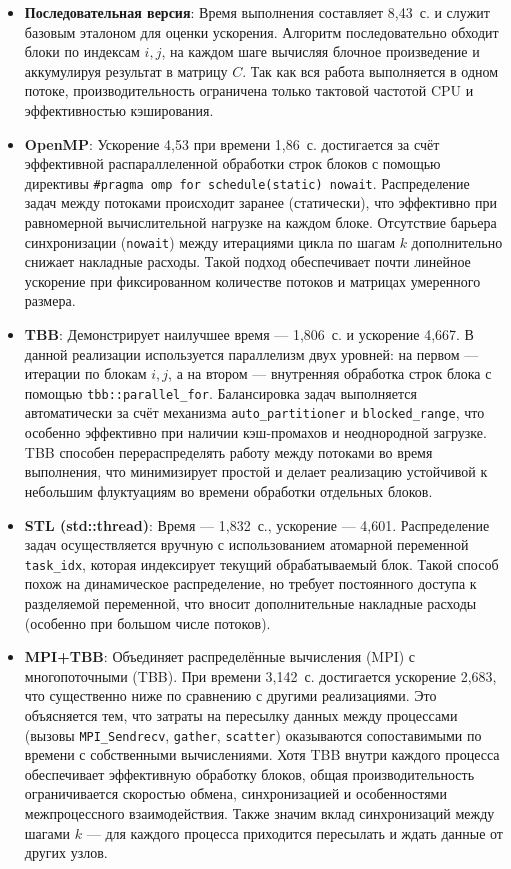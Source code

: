 \documentclass[12pt,a4paper]{extarticle}
\begin{document}
\begin{itemize}
	
	\item \textbf{Последовательная версия}: Время выполнения составляет 8{,}43~с. и служит базовым эталоном для оценки ускорения.  
	Алгоритм последовательно обходит блоки по индексам \(i, j\), на каждом шаге вычисляя блочное произведение и аккумулируя результат в матрицу \(C\).  
	Так как вся работа выполняется в одном потоке, производительность ограничена только тактовой частотой CPU и эффективностью кэширования.
	
	\item \textbf{OpenMP}: Ускорение 4{,}53 при времени 1{,}86~с. достигается за счёт эффективной распараллеленной обработки строк блоков с помощью директивы \texttt{\#pragma omp for schedule(static) nowait}.  
	Распределение задач между потоками происходит заранее (статически), что эффективно при равномерной вычислительной нагрузке на каждом блоке.  
	Отсутствие барьера синхронизации (\texttt{nowait}) между итерациями цикла по шагам \(k\) дополнительно снижает накладные расходы.  
	Такой подход обеспечивает почти линейное ускорение при фиксированном количестве потоков и матрицах умеренного размера.
	
	\item \textbf{TBB}: Демонстрирует наилучшее время --- 1{,}806~с. и ускорение 4{,}667.  
	В данной реализации используется параллелизм двух уровней: на первом — итерации по блокам \(i, j\),  
	а на втором — внутренняя обработка строк блока с помощью \texttt{tbb::parallel\_for}.  
	Балансировка задач выполняется автоматически за счёт механизма \texttt{auto\_partitioner} и \texttt{blocked\_range},  
	что особенно эффективно при наличии кэш-промахов и неоднородной загрузке.  
	TBB способен перераспределять работу между потоками во время выполнения, что минимизирует простой и делает реализацию устойчивой к небольшим флуктуациям во времени обработки отдельных блоков.
	
	\item \textbf{STL (std::thread)}: Время --- 1{,}832~с., ускорение --- 4{,}601.  
	Распределение задач осуществляется вручную с использованием атомарной переменной \texttt{task\_idx},  
	которая индексирует текущий обрабатываемый блок.  
	Такой способ похож на динамическое распределение, но требует постоянного доступа к разделяемой переменной,  
	что вносит дополнительные накладные расходы (особенно при большом числе потоков).  
	
	\item \textbf{MPI+TBB}: Объединяет распределённые вычисления (MPI) с многопоточными (TBB).  
	При времени 3{,}142~с. достигается ускорение 2{,}683, что существенно ниже по сравнению с другими реализациями.  
	Это объясняется тем, что затраты на пересылку данных между процессами (вызовы \texttt{MPI\_Sendrecv}, \texttt{gather}, \texttt{scatter})  
	оказываются сопоставимыми по времени с собственными вычислениями.  
	Хотя TBB внутри каждого процесса обеспечивает эффективную обработку блоков,  
	общая производительность ограничивается скоростью обмена, синхронизацией и особенностями межпроцессного взаимодействия.  
	Также значим вклад синхронизаций между шагами \(k\) — для каждого процесса приходится пересылать и ждать данные от других узлов.
	

\end{itemize}
\end{document}
